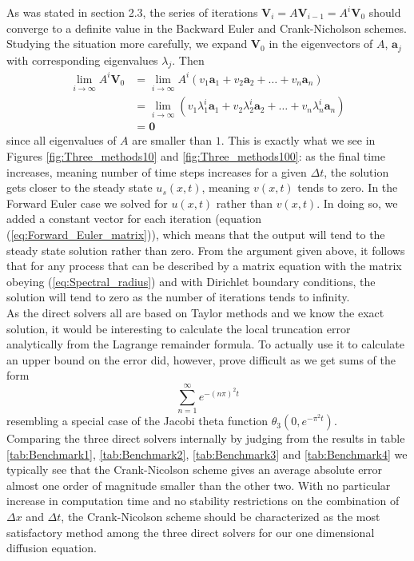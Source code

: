 \documentclass[a4paper, 11pt, notitlepage,english]{article}
\newcommand{\bo}[1]{\boldsymbol{#1}}
\begin{document}
As was stated in section 2.3, the series of iterations $\boldsymbol{V}_i = A\boldsymbol{V}_{i-1} = A^{i}\boldsymbol{V}_0$ should converge to a definite value in the Backward Euler
and Crank-Nicholson schemes.
Studying the situation more carefully, we expand $\boldsymbol{V}_0$ in the eigenvectors of $A$, $\bo{a}_j$ with corresponding eigenvalues $\lambda_j$. Then
\begin{align}
 \lim\limits_{i\to\infty} A^{i}\bo{V}_0 &=  \lim\limits_{i\to\infty}A^i(v_1\bo{a}_1 + v_2\bo{a}_2 + \dots +v_n\bo{a}_n)\nonumber\\
  &=\lim\limits_{i\to\infty} (v_1\lambda_1^i\bo{a}_1 + v_2\lambda_2^i\bo{a}_2 + \dots + v_n\lambda_n^i\bo{a}_n) \nonumber\\
  &= \bo{0}
\end{align}
since all eigenvalues of $A$ are smaller than $1$. This is exactly what we see in Figures \ref{fig:Three_methods10} and \ref{fig:Three_methods100}: as the final time increases,
meaning number of time steps increases for a given $\Delta t$, 
the solution gets closer to the steady state $u_s(x,t)$, meaning $v(x,t)$ tends to zero. In the Forward Euler case we solved for $u(x,t)$ rather than $v(x,t)$. In doing so, we
added a constant vector for each iteration (equation (\ref{eq:Forward_Euler_matrix})), which means that the output will tend to the steady state solution rather than zero.
From the argument given above, it follows that for any process that can be described by a matrix equation with the matrix obeying (\ref{eq:Spectral_radius}) and with Dirichlet
boundary conditions, the solution will tend to zero as the number of iterations tends to infinity. \\

As the direct solvers all are based on Taylor methods and we know the exact solution, it would be interesting to calculate the local truncation error analytically from the Lagrange 
remainder formula. To actually use it to calculate an upper bound on the error did, however, prove difficult as we get sums of the form
\begin{equation}
 \sum\limits_{n=1}^\infty e^{-(n\pi)^2t}
\end{equation}
resembling a special case of the Jacobi theta function $\theta_3(0, e^{-\pi^2t})$. \\

Comparing the three direct solvers internally by judging from the results in table \ref{tab:Benchmark1}, \ref{tab:Benchmark2}, \ref{tab:Benchmark3} and \ref{tab:Benchmark4} we typically see that the Crank-Nicolson scheme gives an average absolute error almost one order of magnitude smaller than the other two. With no particular increase in computation time and no stability restrictions on the combination of $\Delta x$ and $\Delta t$, the Crank-Nicolson scheme should be characterized as the most satisfactory method among the three direct solvers for our one dimensional diffusion equation. \\
\end{document}
